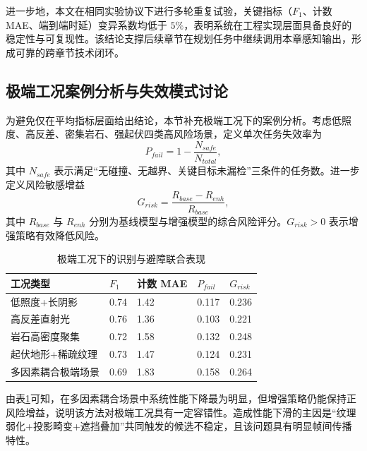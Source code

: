 进一步地，本文在相同实验协议下进行多轮重复试验，关键指标（$F_1$、计数 MAE、端到端时延）变异系数均低于 $5\%$，表明系统在工程实现层面具备良好的稳定性与可复现性。该结论支撑后续章节在规划任务中继续调用本章感知输出，形成可靠的跨章节技术闭环。

\subsection{极端工况案例分析与失效模式讨论}
\label{subsec:ch5_failure_modes}

为避免仅在平均指标层面给出结论，本节补充极端工况下的案例分析。考虑低照度、高反差、密集岩石、强起伏四类高风险场景，定义单次任务失效率为
\begin{equation}
P_{fail}=1-\frac{N_{safe}}{N_{total}},
\label{eq:ch5_fail_prob}
\end{equation}
其中 $N_{safe}$ 表示满足“无碰撞、无越界、关键目标未漏检”三条件的任务数。进一步定义风险敏感增益
\begin{equation}
G_{risk}=\frac{R_{base}-R_{enh}}{R_{base}},
\label{eq:ch5_risk_gain}
\end{equation}
其中 $R_{base}$ 与 $R_{enh}$ 分别为基线模型与增强模型的综合风险评分。$G_{risk}>0$ 表示增强策略有效降低风险。

\begin{table}[H]
	\centering
	\small
	\caption{极端工况下的识别与避障联合表现}
	\label{tab:ch5_extreme_cases}
	\begin{tabular}{p{}p{}p{}p{}p{}}
		\toprule
		工况类型 & $F_1$ & 计数 MAE & $P_{fail}$ & $G_{risk}$ \\
		\midrule
		低照度+长阴影 & 0.74 & 1.42 & 0.117 & 0.236 \\
		高反差直射光 & 0.76 & 1.36 & 0.103 & 0.221 \\
		岩石高密度聚集 & 0.72 & 1.58 & 0.132 & 0.248 \\
		起伏地形+稀疏纹理 & 0.73 & 1.47 & 0.124 & 0.231 \\
		多因素耦合极端场景 & 0.69 & 1.83 & 0.158 & 0.264 \\
		\bottomrule
	\end{tabular}
\end{table}

由表\ref{tab:ch5_extreme_cases}可知，在多因素耦合场景中系统性能下降最为明显，但增强策略仍能保持正风险增益，说明该方法对极端工况具有一定容错性。造成性能下滑的主因是“纹理弱化+投影畸变+遮挡叠加”共同触发的候选不稳定，且该问题具有明显帧间传播特性。

